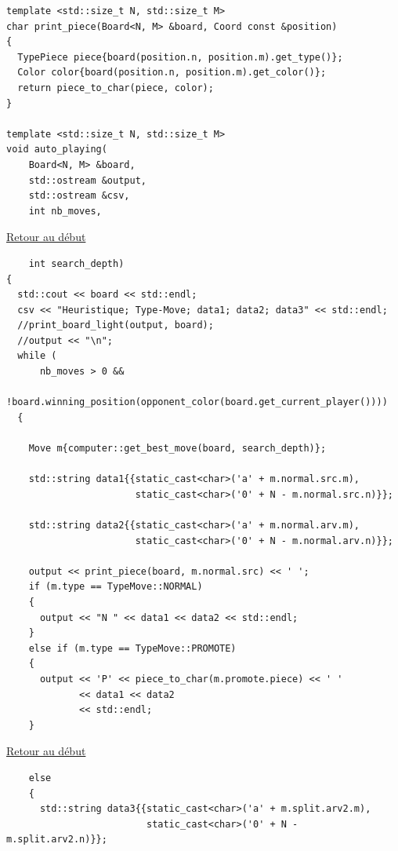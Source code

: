 {\begin{frame}[fragile]
\begin{verbatim}
template <std::size_t N, std::size_t M>
char print_piece(Board<N, M> &board, Coord const &position)
{
  TypePiece piece{board(position.n, position.m).get_type()};
  Color color{board(position.n, position.m).get_color()};
  return piece_to_char(piece, color);
}

template <std::size_t N, std::size_t M>
void auto_playing(
    Board<N, M> &board,
    std::ostream &output,
    std::ostream &csv,
    int nb_moves,
\end{verbatim}
\end{frame}

\begin{frame}[fragile]
\hyperlink{conclusion}{Retour au début}\newline
\begin{verbatim}
    int search_depth)
{
  std::cout << board << std::endl;
  csv << "Heuristique; Type-Move; data1; data2; data3" << std::endl;
  //print_board_light(output, board);
  //output << "\n";
  while (
      nb_moves > 0 &&
      !board.winning_position(opponent_color(board.get_current_player())))
  {

    Move m{computer::get_best_move(board, search_depth)};

    std::string data1{{static_cast<char>('a' + m.normal.src.m),
                       static_cast<char>('0' + N - m.normal.src.n)}};

    std::string data2{{static_cast<char>('a' + m.normal.arv.m),
                       static_cast<char>('0' + N - m.normal.arv.n)}};

    output << print_piece(board, m.normal.src) << ' ';
    if (m.type == TypeMove::NORMAL)
    {
      output << "N " << data1 << data2 << std::endl;
    }
    else if (m.type == TypeMove::PROMOTE)
    {
      output << 'P' << piece_to_char(m.promote.piece) << ' '
             << data1 << data2
             << std::endl;
    }
\end{verbatim}
\end{frame}

\begin{frame}[fragile]
\hyperlink{conclusion}{Retour au début}\newline
\begin{verbatim}
    else
    {
      std::string data3{{static_cast<char>('a' + m.split.arv2.m),
                         static_cast<char>('0' + N - m.split.arv2.n)}};


\end{verbatim}
\end{frame}}
